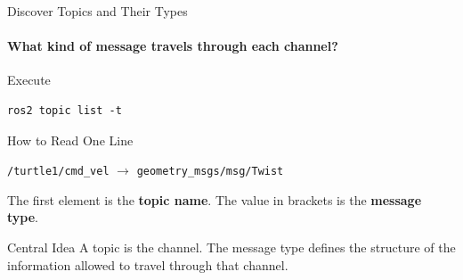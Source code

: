\begin{frame}[fragile]{Discover Topics and Their Types}
\framesubtitle{What kind of message travels through each channel?}

\footnotesize

\begin{block}{Execute}
\begin{verbatim}
ros2 topic list -t
\end{verbatim}
\end{block}


\begin{block}{How to Read One Line}
\begin{center}
\texttt{/turtle1/cmd\_vel}
\quad
\(\longrightarrow\)
\quad
\texttt{geometry\_msgs/msg/Twist}
\end{center}

The first element is the \textbf{topic name}.  
The value in brackets is the \textbf{message type}.
\end{block}

\begin{alertblock}{Central Idea}
A topic is the channel. The message type defines the structure of the
information allowed to travel through that channel.
\end{alertblock}

\end{frame}

